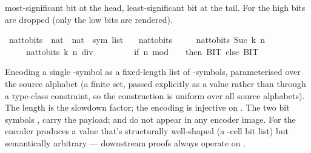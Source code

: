 \begin{isabellebody}
\begin{isamarkuptext}
  most-significant bit at the head, least-significant bit at
  the tail.  For  the high bits are dropped
  (only the low  bits are rendered).%
\end{isamarkuptext}\isamarkuptrue%
\isamarkupfalse%
\ nat{\isacharunderscore}{\kern0pt}to{\isacharunderscore}{\kern0pt}bits\ {\isacharcolon}{\kern0pt}{\isacharcolon}{\kern0pt}\ {\isachardoublequoteopen}nat\ {\isasymRightarrow}\ nat\ {\isasymRightarrow}\ sym{}\ list{\isachardoublequoteclose}\ \isanewline
\ \ {\isachardoublequoteopen}nat{\isacharunderscore}{\kern0pt}to{\isacharunderscore}{\kern0pt}bits\ {}\ {\isacharunderscore}{\kern0pt}\ {\isacharequal}{\kern0pt}\ {\isacharbrackleft}{\kern0pt}{\isacharbrackright}{\kern0pt}{\isachardoublequoteclose}\isanewline
{\isacharbar}{\kern0pt}\ {\isachardoublequoteopen}nat{\isacharunderscore}{\kern0pt}to{\isacharunderscore}{\kern0pt}bits\ {\isacharparenleft}{\kern0pt}Suc\ k{\isacharparenright}{\kern0pt}\ n\ {\isacharequal}{\kern0pt}\isanewline
\ \ \ \ \ nat{\isacharunderscore}{\kern0pt}to{\isacharunderscore}{\kern0pt}bits\ k\ {\isacharparenleft}{\kern0pt}n\ div\ {}{\isacharparenright}{\kern0pt}\isanewline
\ \ \ \ \ \ \ {\isacharat}{\kern0pt}\ {\isacharbrackleft}{\kern0pt}if\ n\ mod\ {}\ {\isacharequal}{\kern0pt}\ {}\ then\ BIT{}\ else\ BIT{}{\isacharbrackright}{\kern0pt}{\isachardoublequoteclose}%
\isadelimdocument
%
\endisadelimdocument
%
\isatagdocument
%
\isamarkuptrue%
%
\endisatagdocument
{\isafolddocument}%
%
\isadelimdocument
%
\endisadelimdocument
%
\begin{isamarkuptext}%
Encoding a single -symbol as a fixed-length list of
  -symbols, parameterised over the source alphabet
  \isa{{\isasymGamma}} (a finite set, passed explicitly as a value rather
  than through a type-class constraint, so the construction is uniform
  over all source alphabets).  The
  length  is the slowdown factor; the encoding is
  injective on \isa{{\isasymGamma}}.  The two bit symbols ,
   carry the payload;  and 
  do not appear in any encoder image.  For  the
  encoder produces a value that's structurally well-shaped (a
  -cell bit list) but semantically arbitrary —
  downstream proofs always operate on .%

\end{isamarkuptext}
\end{isabellebody}
